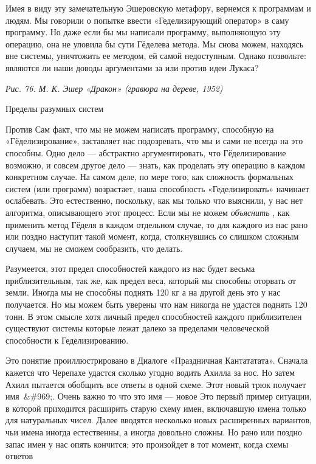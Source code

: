 Имея в виду эту замечательную Эшеровскую метафору, вернемся к программам и людям. Мы говорили о попытке ввести «Геделизирующий оператор» в саму программу. Но даже если бы мы написали программу, выполняющую эту операцию, она не уловила бы сути Гёделева метода. Мы снова можем, находясь вне системы, уничтожить ее методом, ей самой недоступным. Однако позвольте: являются ли наши доводы аргументами за или против идеи Лукаса?

\emph{Рис. 76. М. К. Эшер «Дракон» (гравюра на дереве, 1952)}

Пределы разумных систем

Против Сам факт, что мы не можем написать программу, способную на «Гёделизирование», заставляет нас подозревать, что мы и сами не всегда на это способны. Одно дело --- абстрактно аргументировать, что Гёделизирование возможно, и совсем другое дело --- знать, как проделать эту операцию в каждом конкретном случае. На самом деле, по мере того, как сложность формальных систем (или программ) возрастает, наша способность «Геделизировать» начинает ослабевать. Это естественно, поскольку, как мы только что выяснили, у нас нет алгоритма, описывающего этот процесс. Если мы не можем \emph{объяснить} , как применить метод Гёделя в каждом отдельном случае, то для каждого из нас рано или поздно наступит такой момент, когда, столкнувшись со слишком сложным случаем, мы не сможем сообразить, что делать.

Разумеется, этот предел способностей каждого из нас будет весьма приблизительным, так же, как предел веса, который мы способны оторвать от земли. Иногда мы не способны поднять 120 кг а на другой день это у нас получается. Но мы можем быть уверены что нам никогда не удастся поднять 120 тонн. В этом смысле хотя личный предел способностей каждого приблизителен существуют системы которые лежат далеко за пределами человеческой способности к Геделизированию.

Это понятие проиллюстрировано в Диалоге «Праздничная Кантататата». Сначала кажется что Черепахе удастся сколько угодно водить Ахилла за нос. Но затем Ахилл пытается обобщить все ответы в одной схеме. Этот новый трюк получает имя~\&\#969;. Очень важно то что это имя --- новое Это первый пример ситуации, в которой приходится расширить старую схему имен, включавшую имена только для натуральных чисел. Далее вводятся несколько новых расширенных вариантов, чьи имена иногда естественны, а иногда довольно сложны. Но рано или поздно запас имен у нас опять кончится; это произойдет в тот момент, когда схемы ответов

